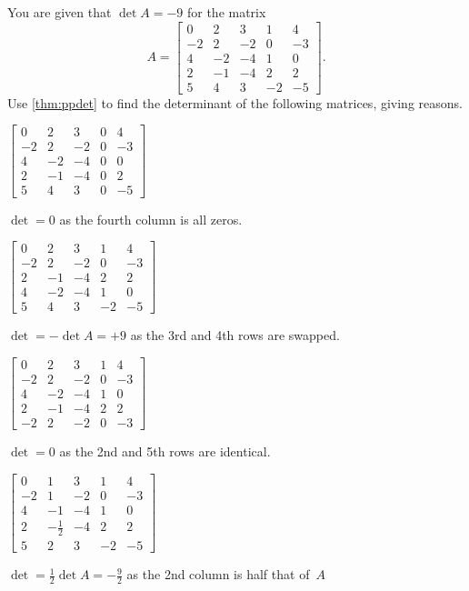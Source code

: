 \begin{example} 
You are given that \(\det A=-9\) for the matrix
\begin{equation*}
A=\begin{bmatrix}0&2&3&1&4
\\-2&2&-2&0&-3
\\4&-2&-4&1&0
\\2&-1&-4&2&2
\\5&4&3&-2&-5\end{bmatrix}.
\end{equation*}
Use \cref{thm:ppdet} to find the determinant of the following matrices, giving reasons. 
\begin{Parts}
\item \(\begin{bmatrix}0&2&3&0&4
\\-2&2&-2&0&-3
\\4&-2&-4&0&0
\\2&-1&-4&0&2
\\5&4&3&0&-5\end{bmatrix}\)
\begin{solution} 
\(\det=0\) as the fourth column is all zeros. 
\end{solution}

\item \(\begin{bmatrix}0&2&3&1&4
\\-2&2&-2&0&-3
\\2&-1&-4&2&2
\\4&-2&-4&1&0
\\5&4&3&-2&-5\end{bmatrix}\)
\begin{solution} 
\(\det=-\det A=+9\) as the 3rd and 4th rows are swapped. 
\end{solution}

\item \(\begin{bmatrix}0&2&3&1&4
\\-2&2&-2&0&-3
\\4&-2&-4&1&0
\\2&-1&-4&2&2
\\-2&2&-2&0&-3\end{bmatrix}\)
\begin{solution} 
\(\det=0\) as the 2nd and 5th rows are identical. 
\end{solution}

\item \(\begin{bmatrix}0&1&3&1&4
\\-2&1&-2&0&-3
\\4&-1&-4&1&0
\\2&-\frac12&-4&2&2
\\5&2&3&-2&-5\end{bmatrix}\)
\begin{solution} 
\(\det=\frac12\det A=-\frac92\) as the 2nd column is half that of~\(A\) 
\end{solution}


\end{Parts}
\end{example}
